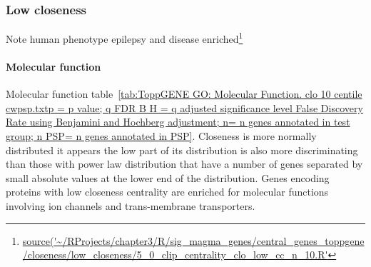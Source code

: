 \subsubsection{Low closeness}

Note human phenotype epilepsy and disease enriched\footnote{\url{source('~/RProjects/chapter3/R/sig_magma_genes/central_genes_toppgene/closeness/low_closeness/5_0_clip_centrality_clo_low_cc_n_10.R'}}
\paragraph{Molecular function}
Molecular function table~\ref{tab:ToppGENE GO: Molecular Function. clo 10 centile cwpsp.txtp = p value; q FDR B H = q adjusted significance level False Discovery Rate using Benjamini and Hochberg adjustment; n= n genes annotated in test group; n PSP= n genes annotated in PSP}. Closeness is more normally distributed it appears the low part of its distribution is also more discriminating than those with power law distribution that have a number of genes separated by small absolute values at the lower end of the distribution. Genes encoding proteins with low closeness centrality are enriched for molecular functions involving ion channels and trans-membrane transporters. 


